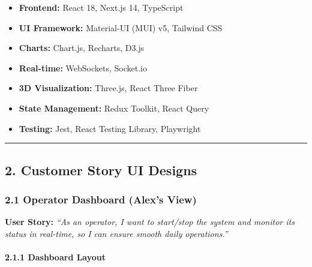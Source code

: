 \documentclass[
]{article}
\providecommand{\tightlist}{%
  \setlength{\itemsep}{0pt}\setlength{\parskip}{0pt}}
\begin{document}
\begin{itemize}
\tightlist
\item
  \textbf{Frontend:} React 18, Next.js 14, TypeScript
\item
  \textbf{UI Framework:} Material-UI (MUI) v5, Tailwind CSS
\item
  \textbf{Charts:} Chart.js, Recharts, D3.js
\item
  \textbf{Real-time:} WebSockets, Socket.io
\item
  \textbf{3D Visualization:} Three.js, React Three Fiber
\item
  \textbf{State Management:} Redux Toolkit, React Query
\item
  \textbf{Testing:} Jest, React Testing Library, Playwright
\end{itemize}

\begin{center}\rule{0.5\linewidth}{0.5pt}\end{center}

\hypertarget{customer-story-ui-designs}{%
\subsection{2. Customer Story UI
Designs}\label{customer-story-ui-designs}}

\hypertarget{operator-dashboard-alexs-view}{%
\subsubsection{2.1 Operator Dashboard (Alex's
View)}\label{operator-dashboard-alexs-view}}

\textbf{User Story:} \emph{``As an operator, I want to start/stop the
system and monitor its status in real-time, so I can ensure smooth daily
operations.''}

\hypertarget{dashboard-layout}{%
\paragraph{2.1.1 Dashboard Layout}\label{dashboard-layout}}
\end{document}
